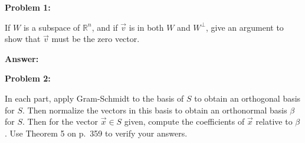 \documentclass[10pt,letterpaper,final]{report}
\newcommand{\R}{\mathbb{R}}
\begin{document}
\begin{center}
  \vline
\end{center}

\medskip
\noindent\textbf{Problem 1:}
\medskip

If $W$ is a subspace of $\R^n$, and if $\vec{v}$ is in both $W$ and $W^{\perp}$, give an argument to show that $\vec{v}$ must be the zero vector.

\medskip
\noindent\textbf{Answer:}

\pagebreak

\noindent\textbf{Problem 2:}
\medskip

In each part, apply Gram-Schmidt to the basis of $S$ to obtain an orthogonal basis for $S$. Then normalize the vectors in this basis to obtain an orthonormal basis $\beta$ for $S$. Then for the vector $\vec{x} \in S$ given, compute the coefficients of $\vec{x}$ relative to $\beta$. Use Theorem 5 on p.~359 to verify your answers.
\end{document}
